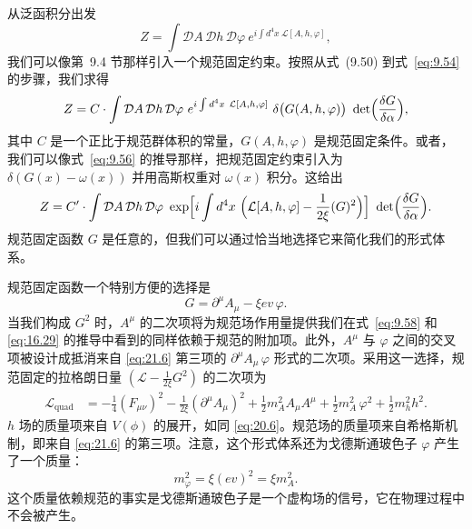 从泛函积分出发
\begin{equation}
  Z = \int \mathcal{D}A\,\mathcal{D}h\,\mathcal{D}\varphi\ e^{i\int
    d^4x\ \mathcal{L}[A,h,\varphi]} ,
  \label{eq:21.8}
\end{equation}
我们可以像第~9.4 节那样引入一个规范固定约束。按照从式~(9.50) 到式~\eqref{eq:9.54} 的步骤，我们求得
\begin{equation}
  Z = C\cdot \int \mathcal{D}A\,\mathcal{D}h\,\mathcal{D}\varphi\ e^{i\int
    d^4x\ \mathcal{L}[A,h,\varphi]}\ \delta\bigl( G(A,h,\varphi) \bigr)\
    \det\Bigl( \frac{\delta G}{\delta\alpha} \Bigr) ,
  \label{eq:21.9}
\end{equation}
其中 $C$ 是一个正比于规范群体积的常量，$G(A,h,\varphi)$ 是规范固定条件。或者，我们可以像式~\eqref{eq:9.56} 的推导那样，把规范固定约束引入为 $\delta(G(x) - \omega(x))$ 并用高斯权重对 $\omega(x)$ 积分。这给出
\begin{equation}
  Z = C'\cdot \int \mathcal{D}A\,\mathcal{D}h\,\mathcal{D}\varphi\ \exp\Bigl[
    i\int d^4x\ \Bigl( \mathcal{L}[A,h,\varphi] - \frac{1}{2\xi}(G)^2
      \Bigr) \Bigr]\ \det\Bigl( \frac{\delta G}{\delta\alpha} \Bigr) .
  \label{eq:21.10}
\end{equation}
规范固定函数 $G$ 是任意的，但我们可以通过恰当地选择它来简化我们的形式体系。

规范固定函数一个特别方便的选择是
\begin{equation}
  G = \partial^\mu A_\mu - \xi e v\,\varphi .
  \label{eq:21.11}
\end{equation}
当我们构成 $G^2$ 时，$A^\mu$ 的二次项将为规范场作用量提供我们在式~\eqref{eq:9.58} 和 \eqref{eq:16.29} 的推导中看到的同样依赖于规范的附加项。此外，$A^\mu$ 与 $\varphi$ 之间的交叉项被设计成抵消来自 \eqref{eq:21.6} 第三项的 $\partial^\mu A_\mu\,\varphi$ 形式的二次项。采用这一选择，规范固定的拉格朗日量 $(\mathcal{L} - \frac{1}{2\xi}G^2)$ 的二次项为
\begin{equation}
  \begin{aligned}
    \mathcal{L}_{\mathrm{quad}} &= -\frac{1}{4}(F_{\mu\nu})^2
      - \frac{1}{2\xi}(\partial^\mu A_\mu)^2
      + \frac{1}{2}m_A^2 A_\mu A^\mu + \frac{1}{2}m_A^2\,\varphi^2
      + \frac{1}{2}m_h^2 h^2 .
  \end{aligned}
  \label{eq:21.12}
\end{equation}
$h$ 场的质量项来自 $V(\phi)$ 的展开，如同 \eqref{eq:20.6}。规范场的质量项来自希格斯机制，即来自 \eqref{eq:21.6} 的第三项。注意，这个形式体系还为戈德斯通玻色子 $\varphi$ 产生了一个质量：
\begin{equation}
  m_\varphi^2 = \xi(e v)^2 = \xi m_A^2 .
  \label{eq:21.13}
\end{equation}
这个质量依赖规范的事实是戈德斯通玻色子是一个虚构场的信号，它在物理过程中不会被产生。

